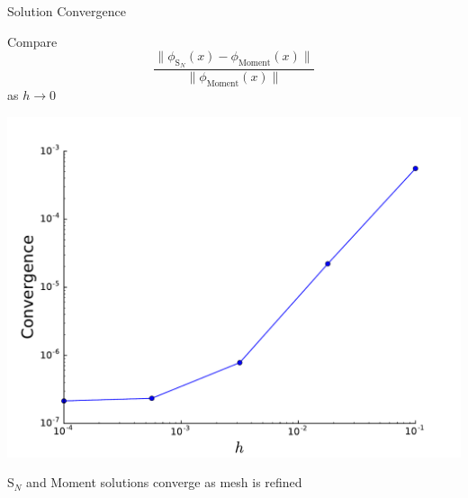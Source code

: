 \documentclass[10pt]{beamer}
\newcommand{\SN}{S$_N$\xspace}
\begin{document}
\begin{frame}{Solution Convergence}

	\onslide<+->
	Compare 
	\begin{equation*}
		\frac{\| \phi_{\text{S}_N}(x) - 
			\phi_\text{Moment}(x)\|}{\|\phi_\text{Moment}(x) \|}
	\end{equation*}
	as $h\rightarrow 0$ 

	\onslide<+->
	\centerline{\includegraphics[width=.5\paperwidth]{figs/hlim.pdf}}

	\onslide<+->
	\SN and Moment solutions converge as mesh is refined 

\end{frame}
\end{document}
